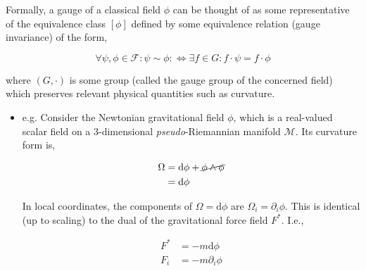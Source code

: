 \documentclass[9pt,handout]{beamer}
\begin{document}
\begin{frame}{}
\begin{definition}
Formally, a gauge of a classical field $\phi$ can be thought of as some representative of the equivalence class $\left[ \phi \right]$ defined by some equivalence relation (gauge invariance) of the form,

$$\forall \psi, \phi \in \mathcal{F} : \psi \sim \phi : \Longleftrightarrow \exists f \in G :  f \cdot \psi = f \cdot \phi$$

where $\left( G, \cdot \right)$ is some group (called the gauge group of the concerned field) which preserves relevant physical quantities such as curvature.
\end{definition}

\begin{itemize}
\item e.g. Consider the Newtonian gravitational field $\phi$, which is a real-valued scalar field on a 3-dimensional \emph{pseudo}-Riemannian manifold $\mathcal{M}$. Its curvature form is,

\begin{align*}
\Omega & = \text{d}\phi + \cancel{\phi \wedge \phi} \\
& = \text{d} \phi
\end{align*}

In local coordinates, the components of $\Omega = \text{d}\phi$ are $\Omega_i = \partial_i \phi$. This is identical (up to scaling) to the dual of the gravitational force field $F^*$. I.e.,

\begin{align*}
F^* & = - m \text{d} \phi \\
F_i & = - m \partial_i \phi
\end{align*}
\end{itemize}
\end{frame}
\end{document}
